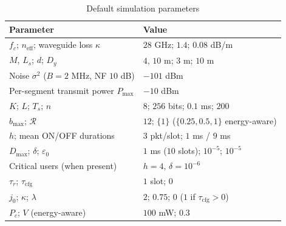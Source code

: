 \documentclass[journal]{IEEEtran}
\newcommand{\Dmax}{D_{\max}}
\newcommand{\Pmax}{P_{\max}}
\newcommand{\neff}{n_{\mathrm{eff}}}
\begin{document}
\begin{table}[t]
\caption{Default simulation parameters}
\label{tab:params}
\centering
\scriptsize
\setlength{\tabcolsep}{3pt}
\begin{tabular}{ll}
\toprule
Parameter & Value\\
\midrule
$f_c$; $\neff$; waveguide loss $\kappa$ & $28$ GHz; $1.4$; $0.08$ dB/m\\
$M$, $L_s$; $d$; $D_y$ & $4$, $10$ m; $3$ m; $10$ m\\
Noise $\sigma^2$ ($B=2$ MHz, NF $10$ dB) & $-101$ dBm\\
Per-segment transmit power $\Pmax$ & $-10$ dBm\\
$K$; $L$; $T_s$; $n$ & $8$; $256$ bits; $0.1$ ms; $200$\\
$b_{\max}$; $\mathcal R$ & $12$; $\{1\}$ ($\{0.25,0.5,1\}$ energy-aware)\\
$h$; mean ON/OFF durations & $3$ pkt/slot; $1$ ms / $9$ ms\\
$\Dmax$; $\delta$; $\varepsilon_0$ & $1$ ms ($10$ slots); $10^{-5}$; $10^{-5}$\\
Critical users (when present) & $h=4$, $\delta=10^{-6}$\\
$\tau_r$; $\tau_{\mathrm{cfg}}$ & $1$ slot; $0$\\
$j_0$; $\kappa$; $\lambda$ & $2$; $0.75$; $0$ ($1$ if $\tau_{\mathrm{cfg}}>0$)\\
$P_c$; $V$ (energy-aware) & $100$ mW; $0.3$\\
\bottomrule
\end{tabular}
\end{table}
\end{document}
